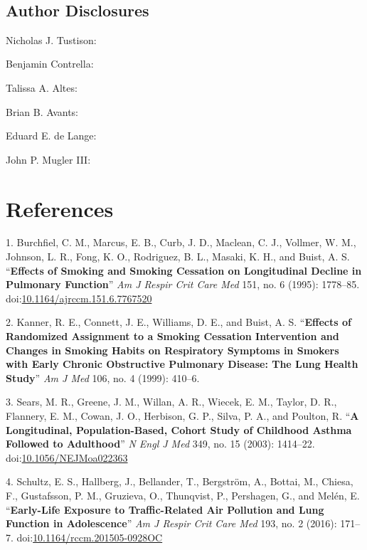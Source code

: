 \documentclass[11pt,]{article}
\begin{document}
~~

\subsection{Author Disclosures}\label{author-disclosures}

Nicholas J. Tustison:

Benjamin Contrella:

Talissa A. Altes:

Brian B. Avants:

Eduard E. de Lange:

John P. Mugler III:

\clearpage

\section*{References}\label{references}

\hypertarget{refs}{}
\hypertarget{ref-Burchfiel:1995aa}{}
1. Burchfiel, C. M., Marcus, E. B., Curb, J. D., Maclean, C. J.,
Vollmer, W. M., Johnson, L. R., Fong, K. O., Rodriguez, B. L., Masaki,
K. H., and Buist, A. S. ``\textbf{Effects of Smoking and Smoking
Cessation on Longitudinal Decline in Pulmonary Function}'' \emph{Am J
Respir Crit Care Med} 151, no. 6 (1995): 1778--85.
doi:\href{https://doi.org/10.1164/ajrccm.151.6.7767520}{10.1164/ajrccm.151.6.7767520}

\hypertarget{ref-Kanner:1999aa}{}
2. Kanner, R. E., Connett, J. E., Williams, D. E., and Buist, A. S.
``\textbf{Effects of Randomized Assignment to a Smoking Cessation
Intervention and Changes in Smoking Habits on Respiratory Symptoms in
Smokers with Early Chronic Obstructive Pulmonary Disease: The Lung
Health Study}'' \emph{Am J Med} 106, no. 4 (1999): 410--6.

\hypertarget{ref-Sears:2003aa}{}
3. Sears, M. R., Greene, J. M., Willan, A. R., Wiecek, E. M., Taylor, D.
R., Flannery, E. M., Cowan, J. O., Herbison, G. P., Silva, P. A., and
Poulton, R. ``\textbf{A Longitudinal, Population-Based, Cohort Study of
Childhood Asthma Followed to Adulthood}'' \emph{N Engl J Med} 349, no.
15 (2003): 1414--22.
doi:\href{https://doi.org/10.1056/NEJMoa022363}{10.1056/NEJMoa022363}

\hypertarget{ref-Schultz:2016aa}{}
4. Schultz, E. S., Hallberg, J., Bellander, T., Bergström, A., Bottai,
M., Chiesa, F., Gustafsson, P. M., Gruzieva, O., Thunqvist, P.,
Pershagen, G., and Melén, E. ``\textbf{Early-Life Exposure to
Traffic-Related Air Pollution and Lung Function in Adolescence}''
\emph{Am J Respir Crit Care Med} 193, no. 2 (2016): 171--7.
doi:\href{https://doi.org/10.1164/rccm.201505-0928OC}{10.1164/rccm.201505-0928OC}
\end{document}
